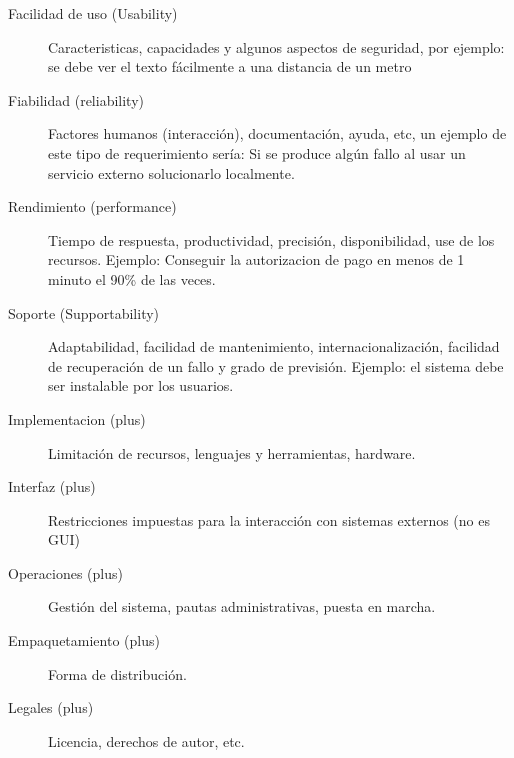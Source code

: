 \documentclass[11pt]{article}
\begin{document}
\begin{description}
\item[{Facilidad de uso (Usability)}] Caracteristicas, capacidades y algunos aspectos de seguridad, por ejemplo: se debe ver el texto fácilmente a una distancia de un metro

\item[{Fiabilidad (reliability)}] Factores humanos (interacción), documentación, ayuda, etc, un ejemplo de este tipo de requerimiento sería: Si se produce algún fallo al usar un servicio externo solucionarlo localmente.

\item[{Rendimiento (performance)}] Tiempo de respuesta, productividad, precisión, disponibilidad, use de los recursos. Ejemplo: Conseguir la autorizacion de pago en menos de 1 minuto el 90\% de las veces.

\item[{Soporte (Supportability)}] Adaptabilidad, facilidad de mantenimiento, internacionalización, facilidad de recuperación de un fallo y grado de previsión. Ejemplo: el sistema debe ser instalable por los usuarios.

\item[{Implementacion (plus)}] Limitación de recursos, lenguajes y herramientas, hardware.

\item[{Interfaz (plus)}] Restricciones impuestas para la interacción con sistemas externos (no es GUI)

\item[{Operaciones (plus)}] Gestión del sistema, pautas administrativas, puesta en marcha.

\item[{Empaquetamiento (plus)}] Forma de distribución.

\item[{Legales (plus)}] Licencia, derechos de autor, etc.
\end{description}
\end{document}
